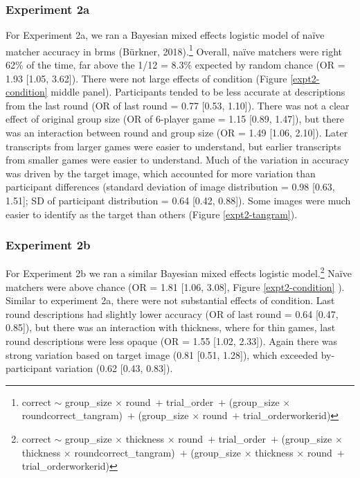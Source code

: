 \documentclass[10pt, letterpaper]{article}
\begin{document}
\subsubsection{Experiment 2a}\label{experiment-2a-1}

For Experiment 2a, we ran a Bayesian mixed effects logistic model of
naïve matcher accuracy in brms (Bürkner, 2018).\footnote{correct
  \({\sim}\) group\_size \({\times}\) round~\({+}\) trial\_order~\({+}\)
  (group\_size \({\times}\) round\textbar correct\_tangram)~\({+}\)
  (group\_size \({\times}\) round~\({+}\) trial\_order\textbar workerid)}
Overall, naïve matchers were right 62\% of the time, far above the 1/12
= 8.3\% expected by random chance (OR = 1.93 {[}1.05, 3.62{]}). There
were not large effects of condition (Figure \ref{expt2-condition} middle
panel). Participants tended to be less accurate at descriptions from the
last round (OR of last round = 0.77 {[}0.53, 1.10{]}). There was not a
clear effect of original group size (OR of 6-player game = 1.15 {[}0.89,
1.47{]}), but there was an interaction between round and group size (OR
= 1.49 {[}1.06, 2.10{]}). Later transcripts from larger games were
easier to understand, but earlier transcripts from smaller games were
easier to understand. Much of the variation in accuracy was driven by
the target image, which accounted for more variation than participant
differences (standard deviation of image distribution = 0.98 {[}0.63,
1.51{]}; SD of participant distribution = 0.64 {[}0.42, 0.88{]}). Some
images were much easier to identify as the target than others (Figure
\ref{expt2-tangram}).

\subsubsection{Experiment 2b}\label{experiment-2b-1}

For Experiment 2b we ran a similar Bayesian mixed effects logistic
model.\footnote{correct \({\sim}\) group\_size \({\times}\) thickness
  \({\times}\) round~\({+}\) trial\_order~\({+}\) (group\_size
  \({\times}\) thickness \({\times}\)
  round\textbar correct\_tangram)~\({+}\) (group\_size \({\times}\)
  thickness \({\times}\) round~\({+}\) trial\_order\textbar workerid)}
Naïve matchers were above chance (OR = 1.81 {[}1.06, 3.08{]}, Figure
\ref{expt2-condition} ). Similar to experiment 2a, there were not
substantial effects of condition. Last round descriptions had slightly
lower accuracy (OR of last round = 0.64 {[}0.47, 0.85{]}), but there was
an interaction with thickness, where for thin games, last round
descriptions were less opaque (OR = 1.55 {[}1.02, 2.33{]}). Again there
was strong variation based on target image (0.81 {[}0.51, 1.28{]}),
which exceeded by-participant variation (0.62 {[}0.43, 0.83{]}).
\end{document}
